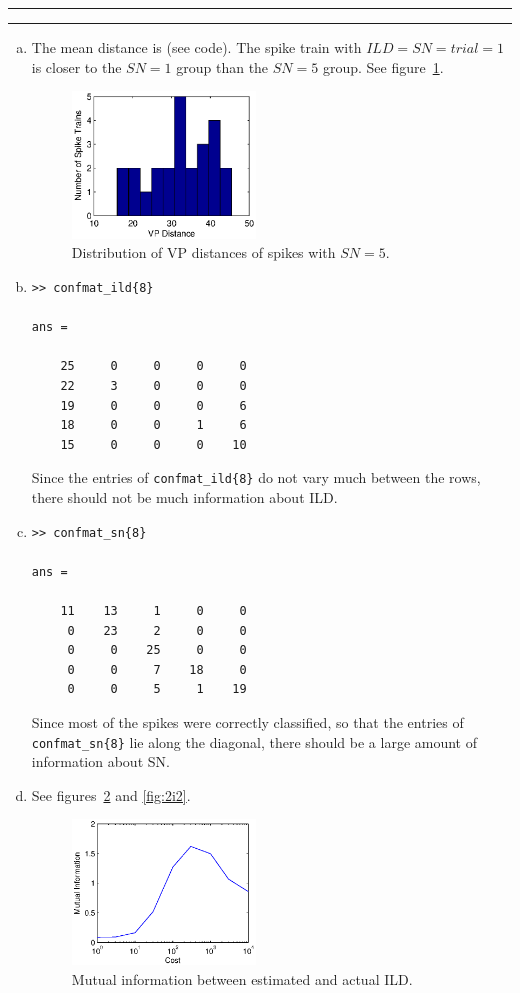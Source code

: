 \documentclass[11pt]{article}
\newcounter{questionCounter}
\newcounter{partCounter}[questionCounter]
\newenvironment{question}[2][\arabic{questionCounter}]{%
    \setcounter{partCounter}{0}%
    \vspace{.25in} \hrule \vspace{0.5em}%
        \noindent{\bf #2}%
    \vspace{0.8em} \hrule \vspace{.10in}%
    \addtocounter{questionCounter}{1}%
}{}
\begin{document}
\begin{question}{Problem 2}
\begin{enumerate}[a.]
\item The mean distance is  (see code). The spike train with
$ILD = SN = trial = 1$ is closer to the $SN = 1$ group than the $SN = 5$
group. See figure~\ref{fig:2e}.
\begin{figure}[h]
\begin{center}
\includegraphics[width=0.46\textwidth]{2e}
\end{center}
\caption{Distribution of VP distances of spikes with $SN = 5$.}
\label{fig:2e}
\end{figure}

\item
\begin{verbatim}
>> confmat_ild{8}

ans =

    25     0     0     0     0
    22     3     0     0     0
    19     0     0     0     6
    18     0     0     1     6
    15     0     0     0    10
\end{verbatim}
Since the entries of \texttt{confmat\_ild\{8\}} do not vary much between the
rows, there should not be much information about ILD.


\item
\begin{verbatim}
>> confmat_sn{8}

ans =

    11    13     1     0     0
     0    23     2     0     0
     0     0    25     0     0
     0     0     7    18     0
     0     0     5     1    19
\end{verbatim}
Since most of the spikes were correctly classified, so that the entries of
\texttt{confmat\_sn\{8\}} lie along the diagonal, there should be a large
amount of information about SN.

\item See figures~\ref{fig:2i1} and \ref{fig:2i2}.
\begin{figure}[h]
\begin{center}
\includegraphics[width=0.46\textwidth]{2i1}
\end{center}
\caption{Mutual information between estimated and actual ILD.}
\label{fig:2i1}
\end{figure}


\end{enumerate}
\end{question}
\end{document}
